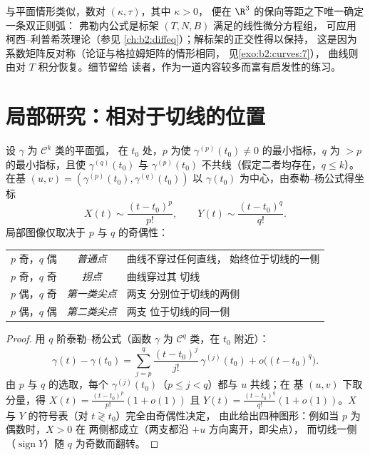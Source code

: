 \begin{remark}[空间曲线基本定理]
与平面情形类似，数对 $(\kappa, \tau)$，其中 $\kappa > 0$，
便在 $\R^3$ 的保向等距之下唯一确定一条双正则弧：
弗勒内公式是标架 $(T, N, B)$ 满足的线性微分方程组，
可应用柯西–利普希茨理论（参见
\cref{ch:b2:diffeq}）；解标架的正交性得以保持，
这是因为系数矩阵反对称（论证与格拉姆矩阵的情形相同，
见\cref{exo:b2:curves:7}），
曲线则由对 $T$ 积分恢复。细节留给
读者，作为一道内容较多而富有启发性的练习。
\end{remark}

\section{局部研究：相对于切线的位置}

\begin{proposition}\label{prop:b2:curves:local}
设 $\gamma$ 为 $\mathcal{C}^k$ 类的平面弧，
在 $t_0$ 处，$p$ 为使 $\gamma^{(p)}(t_0) \neq 0$ 的最小指标，$q$ 为
$> p$ 的最小指标，且使 $\gamma^{(q)}(t_0)$ 与
$\gamma^{(p)}(t_0)$ 不共线（假定二者均存在，$q \leq k$）。
在基 $(u, v) = (\gamma^{(p)}(t_0), \gamma^{(q)}(t_0))$
以 $\gamma(t_0)$ 为中心，由泰勒–杨公式得坐标
\[
X(t) \sim \frac{(t - t_0)^p}{p!},
\qquad
Y(t) \sim \frac{(t - t_0)^q}{q!} .
\]
局部图像仅取决于 $p$ 与 $q$ 的奇偶性：
\begin{center}
\begin{tabular}{c c l}
$p$ 奇，$q$ 偶 & \emph{普通点} & 曲线不穿过任何直线，
始终位于切线的一侧\\
$p$ 奇，$q$ 奇 & \emph{拐点} & 曲线穿过其
切线\\
$p$ 偶，$q$ 奇 & \emph{第一类尖点} & 两支
分别位于切线的两侧\\
$p$ 偶，$q$ 偶 & \emph{第二类尖点} & 两支
位于切线的同一侧\\
\end{tabular}
\end{center}
\end{proposition}

\begin{proof}
用 $q$ 阶泰勒–杨公式（函数 $\gamma$ 为
$\mathcal{C}^q$ 类，在 $t_0$ 附近）：
\[
\gamma(t) - \gamma(t_0)
= \sum_{j=p}^{q} \frac{(t-t_0)^j}{j!}\,\gamma^{(j)}(t_0)
+ o\bigl((t-t_0)^q\bigr).
\]
由 $p$ 与 $q$ 的选取，每个 $\gamma^{(j)}(t_0)$（$p
\leq j < q$）都与 $u$ 共线；在
基 $(u, v)$ 下取分量，得 $X(t) = \frac{(t-t_0)^p}{p!}(1 + o(1))$ 且
$Y(t) = \frac{(t-t_0)^q}{q!}(1 + o(1))$。$X$ 与
$Y$ 的符号表（对 $t \gtrless t_0$）完全由奇偶性决定，
由此给出四种图形：例如当 $p$ 为偶数时，$X > 0$ 在
两侧都成立（两支都沿 $+u$ 方向离开，即尖点），
而切线一侧（$\operatorname{sign} Y$）随
$q$ 为奇数而翻转。
\end{proof}

